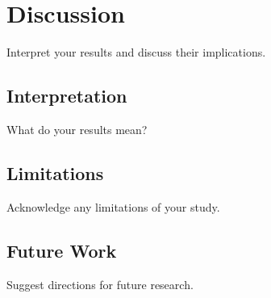 \section{Discussion}
\label{sec:discussion}

Interpret your results and discuss their implications.

\subsection{Interpretation}
What do your results mean?

\subsection{Limitations}
Acknowledge any limitations of your study.

\subsection{Future Work}
Suggest directions for future research.